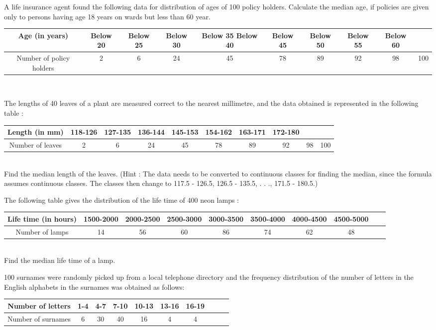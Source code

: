 \item A life insurance agent found the following data for distribution of ages of 100 policy
holders. Calculate the median age, if policies are given only to persons having age 18
years on wards but less than 60 year.
\begin{tabular}{|c|c|c|c|c|c|c|c|c|c|}
\hline
Age (in years)&Below 20&Below 25&Below 30&Below 35 Below 40& Below 45& Below 50& Below 55& Below 60\\
\hline
Number of policy holders&2&6&24&45&78&89&92&98&100\\
\hline
\end{tabular}\\
\item The lengths of 40 leaves of a plant are measured correct to the nearest millimetre, and
the data obtained is represented in the following table :
\begin{tabular}{|c|c|c|c|c|c|c|c|c|c|}
\hline
Length (in mm)&118-126&127-135&136-144&145-153&154-162&163-171&172-180\\
\hline
Number of leaves&2&6&24&45&78&89&92&98&100\\
\hline
\end{tabular}\\
Find the median length of the leaves.
(Hint : The data needs to be converted to continuous classes for finding the median,
since the formula assumes continuous classes. The classes then change to
117.5 - 126.5, 126.5 - 135.5, . . ., 171.5 - 180.5.)
\item The following table gives the distribution of the life time of 400 neon lamps :
\begin{tabular}{|c|c|c|c|c|c|c|c|c|c|}
\hline
Life time (in hours)&1500-2000&2000-2500&2500-3000&3000-3500&3500-4000&4000-4500&4500-5000\\
\hline
Number of lamps&14&56&60&86&74&62&48\\
\hline
\end{tabular}\\
Find the median life time of a lamp.
\item 100 surnames were randomly picked up from a local telephone directory and the
frequency distribution of the number of letters in the English alphabets in the surnames
was obtained as follows:
\begin{tabular}{|c|c|c|c|c|c|c|c|c|c|}
\hline
Number of letters&1-4&4-7&7-10&10-13&13-16&16-19\\
\hline
Number of surnames&6&30&40&16&4&4\\
\hline
\end{tabular}\\
